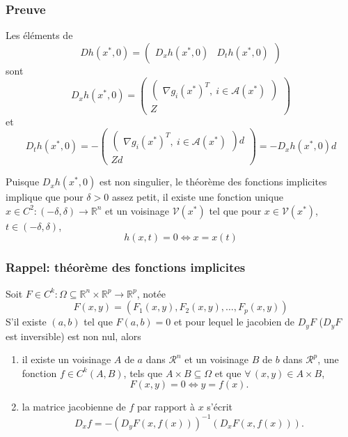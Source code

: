 \documentclass[usepdftitle=false,aspectratio=169]{beamer}
\def\cA{\mathcal{A}}
\def\cR{\mathcal{R}}
\def\cV{\mathcal{V}}
\def\RR{\mathbb{R}}
\begin{document}
\begin{frame}
\frametitle{Preuve}
Les éléments de
$$
D h(x^*, 0) =
\begin{pmatrix}
D_x h(x^*, 0) & D_t h(x^*, 0)
\end{pmatrix}
$$
sont
$$
D_x h(x^*, 0) =
\begin{pmatrix}
\begin{pmatrix}
\nabla g_i(x^*)^T, \ i \in \cA(x^*)
\end{pmatrix} \\
 Z
\end{pmatrix}
$$
et
$$
D_t h(x^*, 0) =
- \begin{pmatrix}
\begin{pmatrix}
\nabla g_i(x^*)^T, \ i \in \cA(x^*)
\end{pmatrix}d \\
Zd
\end{pmatrix}
= -D_x h(x^*, 0)d
$$

Puisque $D_x h(x^*, 0)$ est non singulier, le théorème des fonctions implicites implique que pour $\delta > 0$ assez petit, il existe une fonction unique $x \in C^2: (-\delta, \delta) \rightarrow \RR^n$ et un voisinage $\cV(x^*)$ tel que pour $x \in \cV(x^*)$, $t \in (-\delta, \delta)$,
$$
h(x,t) = 0 \Leftrightarrow x = x(t)
$$

\end{frame}

\begin{frame}
\frametitle{Rappel: théorème des fonctions implicites}

Soit $F \in C^k: \Omega \subseteq \RR^n\times\RR^p \rightarrow \RR^p$, notée
$$
F(x,y) = \left( F_1(x,y), F_2(x,y), \ldots, F_p(x,y) \right)
$$
S'il existe $(a,b)$ tel que $F(a,b) = 0$ et pour lequel le jacobien de $D_yF$ ($D_yF$ est inversible) est non nul, alors
\begin{enumerate}
\item
il existe un voisinage $A$ de $a$ dans $\cR^n$ et un voisinage $B$ de $b$ dans $\cR^p$, une fonction $f \in C^k(A,B)$, tels que $A \times B \subseteq \Omega$ et que $\forall\, (x,y) \in A \times B$,
$$
F(x,y) = 0 \Leftrightarrow y=f(x).
$$
\item
la matrice jacobienne de $f$ par rapport à $x$ s'écrit
$$
D_x f = - \left( D_yF (x, f(x) )\right)^{-1} \left( D_xF (x, f(x))\right).
$$
\end{enumerate}

\end{frame}
\end{document}
